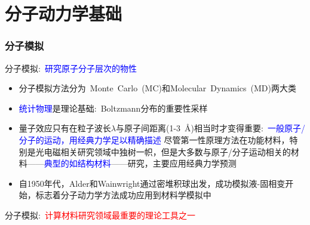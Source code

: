 \small
\section{分子动力学基础}
\frame
{
	\frametitle{分子模拟}
	分子模拟:~\textcolor{blue}{研究原子分子层次的物性}
	\begin{itemize}
		\item 分子模拟方法分为~\textrm{Monte~Carlo~(MC)}和\textrm{Molecular~Dynamics~(MD)}两大类
		\item \textcolor{blue}{统计物理}是理论基础:~\textrm{Boltzmann}分布的重要性采样
	\end{itemize}
	\begin{itemize}
		\item 量子效应只有在粒子波长$\lambda$与原子间距离\textrm{(1-3~\AA)}相当时才变得重要:~\textcolor{blue}{一般原子/分子的运动，用经典力学足以精确描述}
			\vskip 2pt
			尽管第一性原理方法在功能材料，特别是光电磁相关研究领域中独树一帜，但是大多数与原子/分子运动相关的材料——\textcolor{blue}{典型的如结构材料}——研究，主要应用经典力学预测%
		\item 自\textrm{1950}年代，\textrm{Alder}和\textrm{Wainwright}通过密堆积球出发，成功模拟液-固相变开始，标志着分子动力学方法成功应用到材料学模拟中
	\end{itemize}
	分子模拟:~\textcolor{red}{计算材料研究领域最重要的理论工具之一}
}

